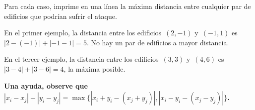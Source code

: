 Para cada caso, imprime en una línea la máxima distancia entre cualquier par de
edificios que podrían sufrir el ataque.

\exampleCases

\begin{example}
\end{example}

\explanationText

En el primer ejemplo, la distancia entre los edificios~$(2, -1)$ y~$(-1, 1)$
es~$|2 - (- 1)| + |-1 - 1| = 5$. No hay un par de edificios a mayor distancia.

En el tercer ejemplo, la distancia entre los edificios~$(3, 3)$ y~$(4, 6)$
es~$|3 - 4| + |3 - 6| = 4$, la máxima posible.

\textbf{Una ayuda, observe que~$|x_i - x_j| + |y_i - y_j| = \max \{|x_i + y_i - (x_j + y_j)|, |x_i - y_i - (x_j -
y_j)| \}$.}
